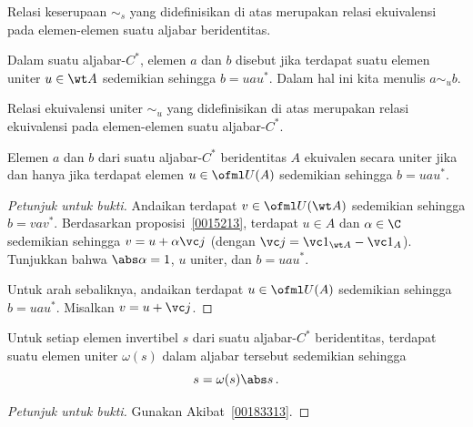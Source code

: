 \begin{prop} Relasi keserupaan $\sim_s$ yang didefinisikan di atas merupakan relasi ekuivalensi pada elemen-elemen suatu aljabar beridentitas.
\end{prop}

\begin{defn} Dalam suatu aljabar-$C^*$, elemen $a$ dan $b$ disebut
 jika terdapat suatu elemen uniter $u \in \wt A$ sedemikian sehingga $b = uau^*$. %
Dalam hal ini kita menulis $a \sim_u b$.
\end{defn}

\begin{prop} Relasi ekuivalensi uniter $\sim_u$ yang didefinisikan di atas merupakan relasi ekuivalensi pada elemen-elemen suatu aljabar-$C^*$.
\end{prop}

\begin{prop}\label{0060224fa} Elemen $a$ dan $b$ dari suatu aljabar-$C^*$ beridentitas $A$ ekuivalen secara uniter jika dan hanya jika
terdapat elemen $u \in \ofml U(A)$ sedemikian sehingga $b = uau^*$.
\end{prop}

\begin{proof}[\emph{Petunjuk untuk bukti}] Andaikan terdapat $v \in \ofml U(\wt A)$ sedemikian sehingga $b = vav^*$. Berdasarkan proposisi~\ref{0015213},
terdapat $u \in A$ dan $\alpha \in \C$ sedemikian sehingga $v = u + \alpha \vc j$ (dengan $\vc j = \vc 1_{\wt A} - \vc 1_A$). Tunjukkan
bahwa $\abs\alpha = 1$, $u$ uniter, dan $b = uau^*$.

Untuk arah sebaliknya, andaikan terdapat $u \in \ofml U(A)$ sedemikian sehingga $b = uau^*$. Misalkan $v = u + \vc j$. \ns
\end{proof}

\begin{prop}\label{0060141} Untuk setiap elemen invertibel $s$ dari suatu
aljabar-$C^*$ beridentitas, terdapat suatu elemen uniter $\omega(s)$ dalam aljabar tersebut sedemikian sehingga %
   \[   s = \omega(s) \abs s\,. \]
\end{prop}

\begin{proof}[\emph{Petunjuk untuk bukti}] Gunakan Akibat~\ref{00183313}.   \ns
\end{proof}


